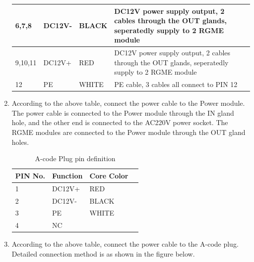 \documentclass{article}
\begin{document}
\begin{enumerate}
\begin{table}[htbp]
\begin{tabular}{|p{2cm}|p{3cm}|p{2cm}|p{6cm}|}
            6,7,8 & DC12V- & BLACK & DC12V power supply output, 2 cables through the OUT glands, seperatedly supply to 2 RGME module \\ \hline
            9,10,11 & DC12V+ & RED & DC12V power supply output, 2 cables through the OUT glands, seperatedly supply to 2 RGME module \\ \hline
            12 & PE & WHITE & PE cable, 3 cables all connect to PIN 12\\ \hline
            \bottomrule
        \end{tabular}
    \end{table}
    \item According to the above table, connect the power cable to the Power module. The power cable is connected to the Power module through the IN gland hole, and the other end is connected to the AC220V power socket. The RGME modules are connected to the Power module through the OUT gland holes.
    \begin{table}
        \centering
        \caption{A-code Plug pin definition}
        \begin{tabular}{|p{2cm}|p{3cm}|p{2cm}|p{6cm}|}
            \hline
            \toprule
            PIN No. & Function & Core Color \\
            \midrule
            1 & DC12V+ & RED \\ \hline
            2 & DC12V- & BLACK \\ \hline
            3 & PE & WHITE \\ \hline
            4 & NC &  \\ \hline
            \bottomrule
        \end{tabular}
    \end{table}
    \item According to the above table, connect the power cable to the A-code plug. Detailed connection method is as shown in the figure below.
    \begin{figure}[H]
        \centering

\end{figure}
\end{enumerate}
\end{document}
